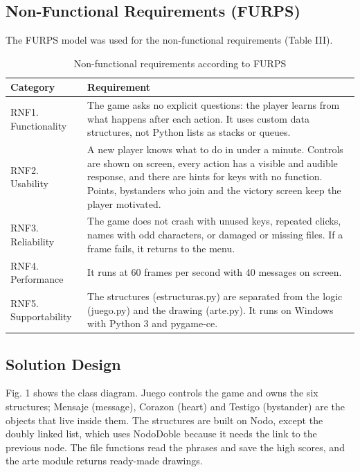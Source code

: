 \documentclass[conference]{IEEEtran}
\begin{document}
\subsection{Non-Functional Requirements (FURPS)}

The FURPS model was used for the non-functional requirements (Table III).

\begin{table}[!htbp]
\centering
\caption{Non-functional requirements according to FURPS}
\footnotesize
\begin{tabularx}{\textwidth}{|P{2.6cm}|X|}
\hline
\textbf{Category} & \textbf{Requirement} \\ \hline
RNF1. Functionality & The game asks no explicit questions: the player learns from what happens after each action. It uses custom data structures, not Python lists as stacks or queues. \\ \hline
RNF2. Usability & A new player knows what to do in under a minute. Controls are shown on screen, every action has a visible and audible response, and there are hints for keys with no function. Points, bystanders who join and the victory screen keep the player motivated. \\ \hline
RNF3. Reliability & The game does not crash with unused keys, repeated clicks, names with odd characters, or damaged or missing files. If a frame fails, it returns to the menu. \\ \hline
RNF4. Performance & It runs at 60 frames per second with 40 messages on screen. \\ \hline
RNF5. Supportability & The structures (estructuras.py) are separated from the logic (juego.py) and the drawing (arte.py). It runs on Windows with Python 3 and pygame-ce. \\ \hline
\end{tabularx}
\end{table}

\subsection{Solution Design}

Fig. 1 shows the class diagram. Juego controls the game and owns the six structures; Mensaje (message), Corazon (heart) and Testigo (bystander) are the objects that live inside them. The structures are built on Nodo, except the doubly linked list, which uses NodoDoble because it needs the link to the previous node. The file functions read the phrases and save the high scores, and the arte module returns ready-made drawings.
\end{document}
